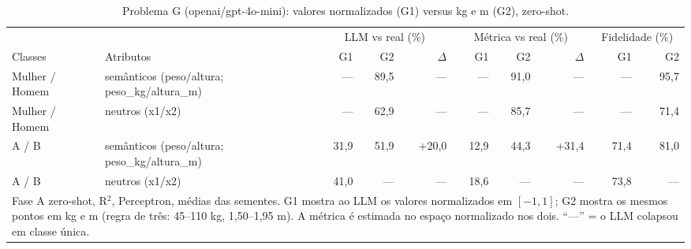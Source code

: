 \begin{table}[htbp]
\centering
\small
\caption{Problema G (openai/gpt-4o-mini): valores normalizados (G1) versus kg e m (G2), zero-shot.}
\label{tab:bloco3_G1_vs_G2_zero_shot_gpt4mini}
\begin{tabular}{llrrrrrrrr}
\toprule
 &  & \multicolumn{3}{c}{LLM vs real (\%)} & \multicolumn{3}{c}{Métrica vs real (\%)} & \multicolumn{2}{c}{Fidelidade (\%)} \\ \cmidrule(lr){3-5} \cmidrule(lr){6-8} \cmidrule(lr){9-10}
Classes & Atributos & G1 & G2 & $\Delta$ & G1 & G2 & $\Delta$ & G1 & G2 \\
\midrule
Mulher / Homem & semânticos (peso/altura; peso\_kg/altura\_m) & — & 89,5 & — & — & 91,0 & — & — & 95,7 \\
Mulher / Homem & neutros (x1/x2) & — & 62,9 & — & — & 85,7 & — & — & 71,4 \\
A / B & semânticos (peso/altura; peso\_kg/altura\_m) & 31,9 & 51,9 & +20,0 & 12,9 & 44,3 & +31,4 & 71,4 & 81,0 \\
A / B & neutros (x1/x2) & 41,0 & — & — & 18,6 & — & — & 73,8 & — \\
\bottomrule
\multicolumn{10}{p{0.95\linewidth}}{\footnotesize Fase A zero-shot, R$^2$, Perceptron, médias das sementes. G1 mostra ao LLM os valores normalizados em $[-1, 1]$; G2 mostra os mesmos pontos em kg e m (regra de três: 45–110 kg, 1,50–1,95 m). A métrica é estimada no espaço normalizado nos dois. ``—'' = o LLM colapsou em classe única.} \\
\end{tabular}
\end{table}

